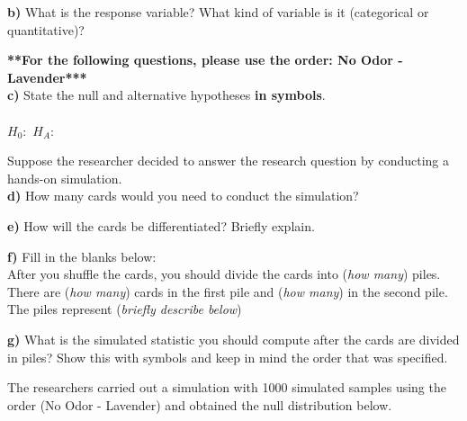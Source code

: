 \documentclass[12pt, oneside]{article}
\newcommand{\noi}{\noindent}
\begin{document}
\noi
{\bf b)} What is the response variable? What kind of variable is it (categorical or quantitative)?\\
\vspace{0.5in}

\noi
{\bf ***For the following questions, please use the order: No Odor - Lavender***} \\

\noi
{\bf c)} State the null and alternative hypotheses {\bf in symbols}.\\
\\

\noi
$H_0:$ \underline{\hspace{3in}} \quad $H_A:$ \underline{\hspace{3in}}
\vspace{0.4in}

\noi
Suppose the researcher decided to answer the research question by conducting a hands-on simulation.\\

\noi
{\bf d)} How many cards would you need to conduct the simulation? \underline{\hspace{2in}}\\
\vspace{0.05in}

\noi
{\bf e)} How will the cards be differentiated? Briefly explain.\\
\vspace{1in}

\noi
{\bf f)} Fill in the blanks below:\\

\noi
After you shuffle the cards, you should divide the cards into (\emph{how many})\underline{\hspace{1.5in}} piles. There are (\emph{how many}) \underline{\hspace{1.5in}} cards in the first pile and (\emph{how many})\underline{\hspace{1.5in}} in the second pile. \\
The piles represent (\emph{briefly describe below})
\vspace{0.75in}

\noi
{\bf g)} What is the simulated statistic you should compute after the cards are divided in piles? Show this with symbols and keep in mind the order that was specified.\\
\vspace{0.75in}

\noi
The researchers carried out a simulation with 1000 simulated samples using the order (No Odor - Lavender) and obtained the null distribution below.\\
\end{document}
